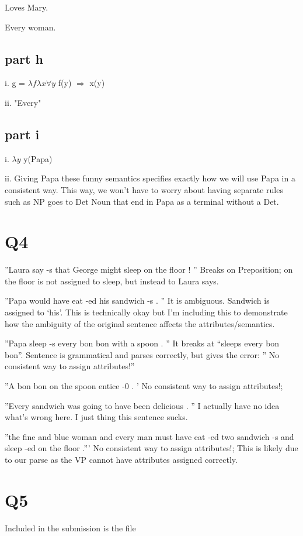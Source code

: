 \documentclass[12pt, letterpaper]{article}
\begin{document}
Loves Mary.

Every woman.

\subsection{part h}

i. g = $\lambda f \lambda x \forall y$ f(y) $\Rightarrow$ x(y)

ii. "Every"

\subsection{part i}

i. $\lambda y$ y(Papa)

ii. Giving Papa these funny semantics specifies exactly how we will use Papa in a consistent way. This way, we won't have to worry about having separate rules such as NP goes to Det Noun that end in Papa as a terminal without a Det.

\section{Q4}

''Laura say -s that George might sleep on the floor ! ''
Breaks on Preposition; on the floor is not assigned to sleep, but instead to Laura says. 


''Papa would have eat -ed his sandwich -s . ''
It is ambiguous. Sandwich is assigned to `his'. This is technically okay but I'm including this to demonstrate how the ambiguity of the original sentence affects the attributes/semantics.

''Papa sleep -s every bon bon with a spoon . ''
It breaks at ``sleeps every bon bon''. Sentence is grammatical and parses correctly, but gives the error: '' No consistent way to assign attributes!''


''A bon bon on the spoon entice -0 . '
No consistent way to assign attributes!; 

''Every sandwich was going to have been delicious . ''
I actually have no idea what's wrong here. I just thing this sentence sucks.

''the fine and blue woman and every man must have eat -ed two sandwich -s and sleep -ed on the floor .'''
No consistent way to assign attributes!; This is likely due to our parse as the VP cannot have attributes assigned correctly. 


\section{Q5}
Included in the submission is the file
\end{document}
